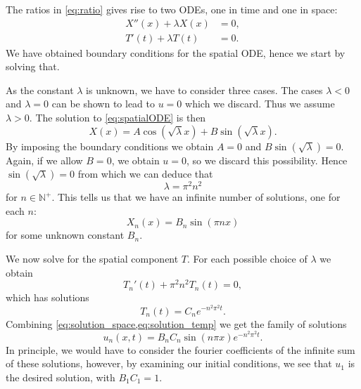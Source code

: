 \documentclass[article, a4paper, oneside]{memoir}
\begin{document}
	The ratios in \cref{eq:ratio} gives rise to two ODEs, one in time and
	one in space:
	\begin{align}
		X''(x) + \lambda X(x) &= 0, \label{eq:spatialODE} \\
		T'(t) + \lambda T(t) &= 0 \label{eq:temp_ODE}.
	\end{align}
	We have obtained boundary conditions for the spatial ODE, hence we
	start by solving that.
	
	As the constant \( \lambda \) is unknown, we have to consider three
	cases. The cases \( \lambda < 0 \) and \( \lambda = 0 \) can be shown
	to lead to \( u = 0\) which we discard. Thus we assume \( \lambda >
	0\).  The solution to \cref{eq:spatialODE} is then
	\begin{equation}
		X(x) = A\cos(\sqrt{\lambda}x) + B\sin(\sqrt{\lambda}x).
	\end{equation}
	By imposing the boundary conditions we obtain \( A = 0 \) and \(
	B\sin(\sqrt{\lambda}) = 0 \). Again, if we allow \( B = 0\), we obtain
	\( u = 0\), so we discard this possibility. Hence \( \sin(\sqrt{\lambda}) = 0
	\) from which we can deduce that
	\begin{equation}
		\lambda = \pi^2 n^2 
	\end{equation}
	for \( n \in \mathbb{N}^+\). This tells us that we have an infinite
	number of solutions, one for each \( n \):
	\begin{equation}
		\label{eq:solution_space}
		X_n(x) = B_n\sin(\pi n x)
	\end{equation}
	for some unknown constant \( B_n \).
	

	We now solve for the spatial component \( T \). For each possible
	choice of \( \lambda \) we obtain
	\begin{equation}
		T_n'(t) +\pi^2 n^2T_n(t) = 0, 
	\end{equation}
	which has solutions
	\begin{equation}
		\label{eq:solution_temp}
		T_n(t) = C_n e^{-n^2\pi^2t}.
	\end{equation}
	Combining \cref{eq:solution_space,eq:solution_temp} we get the family of solutions
	\begin{equation}
		u_n(x, t) = B_n C_n \sin(n\pi x)e^{-n^2\pi^2t}.
	\end{equation}
	In principle, we would have to consider the fourier coefficients of the
	infinite sum of these solutions, however, by examining our initial
	conditions, we see that \( u_1 \) is the desired solution, with \( B_1
	C_1 = 1 \).
\end{document}
